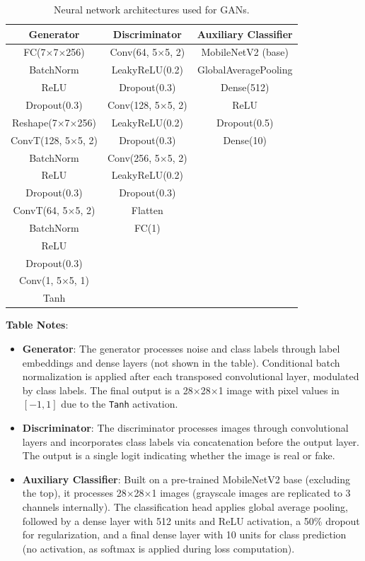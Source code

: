 \documentclass[12pt]{article}
\begin{document}
\begin{table}[h]
\centering
\caption{Neural network architectures used for GANs.}
\label{tab:gan_architecture}
\begin{tabular}{c|c|c}
\hline
\textbf{Generator} & \textbf{Discriminator} & \textbf{Auxiliary Classifier} \\ \hline
FC(7$\times$7$\times$256) & Conv(64, 5$\times$5, 2) & MobileNetV2 (base) \\
BatchNorm & LeakyReLU(0.2) & GlobalAveragePooling \\
ReLU & Dropout(0.3) & Dense(512) \\
Dropout(0.3) & Conv(128, 5$\times$5, 2) & ReLU \\
Reshape(7$\times$7$\times$256) & LeakyReLU(0.2) & Dropout(0.5) \\
ConvT(128, 5$\times$5, 2) & Dropout(0.3) & Dense(10) \\
BatchNorm & Conv(256, 5$\times$5, 2) &  \\
ReLU & LeakyReLU(0.2) &  \\
Dropout(0.3) & Dropout(0.3) &  \\
ConvT(64, 5$\times$5, 2) & Flatten &  \\
BatchNorm & FC(1) &  \\
ReLU &  &  \\
Dropout(0.3) &  &  \\
Conv(1, 5$\times$5, 1) &  &  \\
Tanh &  &  \\ \hline
\end{tabular}
\end{table}

\textbf{Table Notes}:
\begin{itemize}
    \item \textbf{Generator}: The generator processes noise and class labels through label embeddings and dense layers (not shown in the table). Conditional batch normalization is applied after each transposed convolutional layer, modulated by class labels. The final output is a 28$\times$28$\times$1 image with pixel values in $[-1, 1]$ due to the \texttt{Tanh} activation.
    \item \textbf{Discriminator}: The discriminator processes images through convolutional layers and incorporates class labels via concatenation before the output layer. The output is a single logit indicating whether the image is real or fake.
    \item \textbf{Auxiliary Classifier}: Built on a pre-trained MobileNetV2 base (excluding the top), it processes 28$\times$28$\times$1 images (grayscale images are replicated to 3 channels internally). The classification head applies global average pooling, followed by a dense layer with 512 units and ReLU activation, a 50\% dropout for regularization, and a final dense layer with 10 units for class prediction (no activation, as softmax is applied during loss computation).
\end{itemize}
\end{document}
